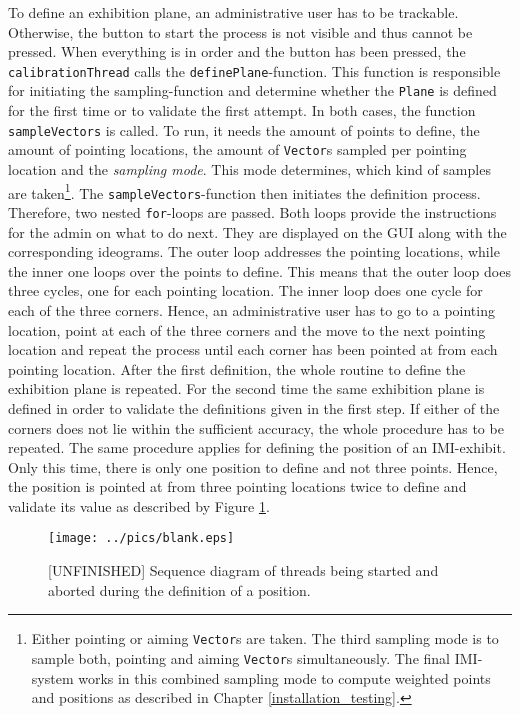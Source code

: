 To define an exhibition plane, an administrative user has to be trackable. Otherwise, the button to start the process is not visible and thus cannot be pressed. When everything is in order and the button has been pressed, the \texttt{calibrationThread} calls the \texttt{definePlane}-function. This function is responsible for initiating the sampling-function and determine whether the \texttt{Plane} is defined for the first time or to validate the first attempt. In both cases, the function \texttt{sampleVectors} is called. To run, it needs the amount of points to define, the amount of pointing locations, the amount of \texttt{Vector}s sampled per pointing location and the \textit{sampling mode}. This mode determines, which kind of samples are taken\footnote{Either pointing or aiming \texttt{Vector}s are taken. The third sampling mode is to sample both, pointing and aiming \texttt{Vector}s simultaneously. The final \ac{IMI}-system works in this combined sampling mode to compute weighted points and positions as described in Chapter \ref{installation_testing}.}. The \texttt{sampleVectors}-function then initiates the definition process. Therefore, two nested \texttt{for}-loops are passed. Both loops provide the instructions for the admin on what to do next. They are displayed on the \ac{GUI} along with the corresponding ideograms. The outer loop addresses the pointing locations, while the inner one loops over the points to define. This means that the outer loop does three cycles, one for each pointing location. The inner loop does one cycle for each of the three corners. Hence, an administrative user has to go to a pointing location, point at each of the three corners and the move to the next pointing location and repeat the process until each corner has been pointed at from each pointing location. After the first definition, the whole routine to define the exhibition plane is repeated. For the second time the same exhibition plane is defined in order to validate the definitions given in the first step. If either of the corners does not lie within the sufficient accuracy, the whole procedure has to be repeated. The same procedure applies for defining the position of an \ac{IMI}-exhibit. Only this time, there is only one position to define and not three points. Hence, the position is pointed at from three pointing locations twice to define and validate its value as described by Figure \ref{fig:def_position}.
\begin{figure}[H]%
\texttt{[image: ../pics/blank.eps]}%
\caption{[UNFINISHED] Sequence diagram of threads being started and aborted during the definition of a position.}
\label{fig:def_position} %
\end{figure}

